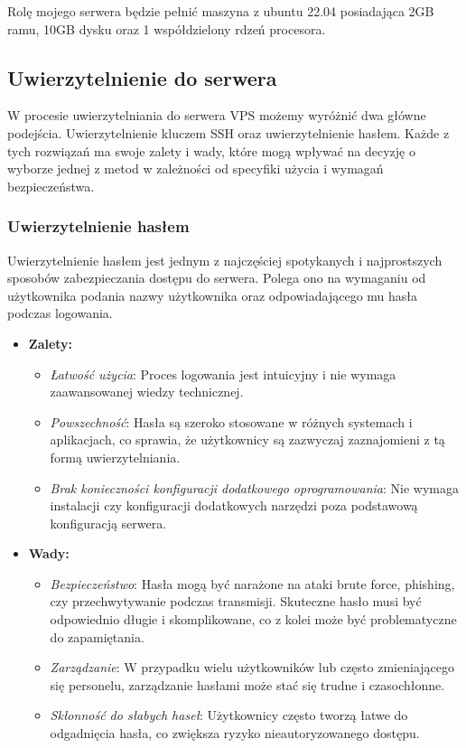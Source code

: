\documentclass{article}
\begin{document}
Rolę mojego serwera będzie pełnić maszyna z ubuntu 22.04 posiadająca 2GB ramu, 10GB dysku oraz 1 współdzielony rdzeń procesora.

\subsection{Uwierzytelnienie do serwera}

W procesie uwierzytelniania do serwera VPS możemy wyróżnić dwa główne podejścia. Uwierzytelnienie kluczem SSH oraz uwierzytelnienie hasłem. Każde z tych rozwiązań ma swoje zalety i wady, które mogą wpływać na decyzję o wyborze jednej z metod w zależności od specyfiki użycia i wymagań bezpieczeństwa.

\subsubsection{Uwierzytelnienie hasłem}

Uwierzytelnienie hasłem jest jednym z najczęściej spotykanych i najprostszych sposobów zabezpieczania dostępu do serwera. Polega ono na wymaganiu od użytkownika podania nazwy użytkownika oraz odpowiadającego mu hasła podczas logowania.

\begin{itemize}
    \item \textbf{Zalety:}
    \begin{itemize}
        \item \textit{Łatwość użycia}: Proces logowania jest intuicyjny i nie wymaga zaawansowanej wiedzy technicznej.
        \item \textit{Powszechność}: Hasła są szeroko stosowane w różnych systemach i aplikacjach, co sprawia, że użytkownicy są zazwyczaj zaznajomieni z tą formą uwierzytelniania.
        \item \textit{Brak konieczności konfiguracji dodatkowego oprogramowania}: Nie wymaga instalacji czy konfiguracji dodatkowych narzędzi poza podstawową konfiguracją serwera.
    \end{itemize}
    \item \textbf{Wady:}
    \begin{itemize}
        \item \textit{Bezpieczeństwo}: Hasła mogą być narażone na ataki brute force, phishing, czy przechwytywanie podczas transmisji. Skuteczne hasło musi być odpowiednio długie i skomplikowane, co z kolei może być problematyczne do zapamiętania.
        \item \textit{Zarządzanie}: W przypadku wielu użytkowników lub często zmieniającego się personelu, zarządzanie hasłami może stać się trudne i czasochłonne.
        \item \textit{Skłonność do słabych haseł}: Użytkownicy często tworzą łatwe do odgadnięcia hasła, co zwiększa ryzyko nieautoryzowanego dostępu.
    \end{itemize}
\end{itemize}
\end{document}
